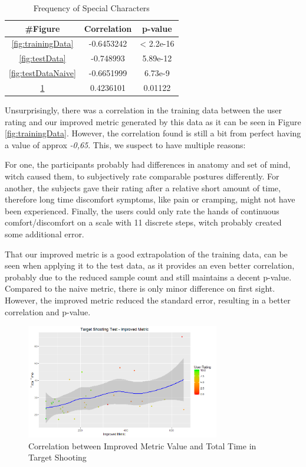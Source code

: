 \documentclass{sig-alternate-05-2015}
\begin{document}
\begin{table}[h]
\centering
\begin{tabular}{|c|c|c|} \hline
\#Figure & Correlation & p-value\\ \hline
\ref{fig:trainingData} & -0.6453242 & < 2.2e-16\\ \hline
\ref{fig:testData} & -0.748993 & 5.89e-12\\ \hline
\ref{fig:testDataNaive} & -0.6651999 & 6.73e-9\\ \hline
\ref{fig:targetShooting} & 0.4236101 & 0.01122\\ \hline
\end{tabular}
\caption{Frequency of Special Characters}
\label{tab:correlations}
\end{table}

Unsurprisingly, there was a correlation in the training data between the user rating and our improved metric generated by this data as it can be seen in Figure \ref{fig:trainingData}. However, the correlation found is still a bit from perfect having a value of approx \textsl{-0,65}. This, we  suspect  to have  multiple  reasons: 

For one, the participants probably had differences in anatomy and set of mind, witch caused them, to subjectively rate comparable postures differently. For another, the subjects gave their rating after a relative short amount of time, therefore long time discomfort symptoms, like pain or cramping, might not have been experienced. Finally, the users could only rate the hands of continuous comfort/discomfort on a scale with 11 discrete steps, witch probably created some additional error.

That our improved metric is a good extrapolation of the training data, can be seen when applying it to the test data, as it provides an even better correlation, probably due to the reduced sample count and still maintains a decent p-value. Compared to the naive metric, there is only minor difference on first sight. However, the improved metric reduced the standard error, resulting in a better correlation and p-value.

\begin{figure}[h]
\centering
\includegraphics[width=8.45cm]{targetShootingImproved}
\vspace{-20pt}
\caption{Correlation between Improved Metric Value and Total Time in Target Shooting}
\label{fig:targetShooting}
\vspace{-10pt}
\end{figure}
\end{document}
